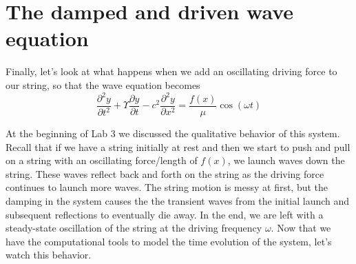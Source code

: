 \section*{The damped and driven wave equation}
Finally, let\rq s look at what happens when we add an oscillating driving force to our
string, so that the wave equation becomes
\begin{equation}\label{eq:515}
\frac{\partial^2 y}{\partial t^2} + \Upsilon \frac{\partial y}{\partial t}-c^2\frac{\partial^2 y}{\partial x^2} = \frac{f(x)}{\mu} \cos(\omega t )
\end{equation}

At the beginning of Lab 3 we discussed the qualitative behavior of this system.
Recall that if we have a string initially at rest and then we start to push and pull on
a string with an oscillating force/length of $f(x)$, we launch waves down the string.
These waves reflect back and forth on the string as the driving force continues
to launch more waves. The string motion is messy at first, but the damping in
the system causes the the transient waves from the initial launch and subsequent
reflections to eventually die away. In the end, we are left with a steady-state
oscillation of the string at the driving frequency $\omega$.
Now that we have the computational tools to model the time evolution of the
system, let\rq s watch this behavior.
